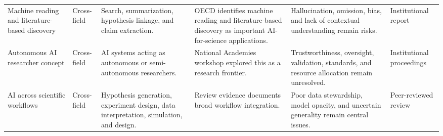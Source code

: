 \documentclass[12pt]{article}
\begin{document}
\begin{longtable}{p{3.0cm}p{2.1cm}p{2.9cm}p{3.2cm}p{3.0cm}p{2.4cm}}
Machine reading and literature-based discovery & Cross-field & Search, summarization, hypothesis linkage, and claim extraction. & OECD identifies machine reading and literature-based discovery as important AI-for-science applications. & Hallucination, omission, bias, and lack of contextual understanding remain risks. & Institutional report \cite{ref2} \\
Autonomous AI researcher concept & Cross-field & AI systems acting as autonomous or semi-autonomous researchers. & National Academies workshop explored this as a research frontier. & Trustworthiness, oversight, validation, standards, and resource allocation remain unresolved. & Institutional proceedings \cite{ref3} \\
AI across scientific workflows & Cross-field & Hypothesis generation, experiment design, data interpretation, simulation, and design. & Review evidence documents broad workflow integration. & Poor data stewardship, model opacity, and uncertain generality remain central issues. & Peer-reviewed review \cite{ref1} \\
\bottomrule
\end{longtable}
\end{document}

